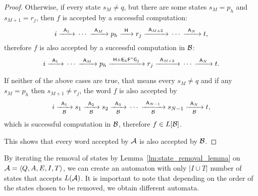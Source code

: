 \begin{proof}
    Otherwise, if every state $s_M \neq q$, but there are some states $s_M = p_h$ and $s_{M+1} = r_j$, then $f$ is accepted by a successful computation:
    \[
        i {\; \xrightarrow[]{\: \; {\mathsf{A}}_1 \: \;} \;} \dotsm {\; \xrightarrow[]{\: \; {\mathsf{A}}_M \: \;} \;} p_h {\; \xrightarrow[]{\: \; {\mathsf{H}} \: \;} \;} r_j {\; \xrightarrow[]{\: \; {\mathsf{A}}_{M+2} \: \;} \;} \dotsm {\; \xrightarrow[]{\: \; {\mathsf{A}}_N \: \;} \;} t,
    \]
    therefore $f$ is also accepted by a successful computation in ${\mathcal{B}}$:
    \[
        i {\; \xrightarrow[]{\: \; {\mathsf{A}}_1 \: \;} \;} \dotsm {\; \xrightarrow[]{\: \; {\mathsf{A}}_M \: \;} \;} p_h {\; \xrightarrow[]{\: \; {\mathsf{H}} + {\mathsf{E}}_h{\mathsf{F}}^*{\mathsf{G}}_j \: \;} \;} r_j {\; \xrightarrow[]{\: \; {\mathsf{A}}_{M+2} \: \;} \;} \dotsm {\; \xrightarrow[]{\: \; {\mathsf{A}}_N \: \;} \;} t.
    \]

    If neither of the above cases are true, that means every $s_M \neq q$ and if any $s_M = p_h$ then $s_{M+1} \neq r_j$, the word $f$ is also accepted by
    \[
        i {\; \xrightarrow[{\mathcal{B}}]{\: \; {\mathsf{A}}_1 \: \;} \;} s_1 {\; \xrightarrow[{\mathcal{B}}]{\: \; {\mathsf{A}}_2 \: \;} \;} s_2 {\; \xrightarrow[{\mathcal{B}}]{\: \; {\mathsf{A}}_3 \: \;} \;} \dotsm {\; \xrightarrow[{\mathcal{B}}]{\: \; {\mathsf{A}}_{N-1} \: \;} \;} s_{N-1} {\; \xrightarrow[{\mathcal{B}}]{\: \; {\mathsf{A}}_N \: \;} \;} t,
    \]
    which is successful computation in ${\mathcal{B}}$, therefore $f \in L[{\mathcal{B}}]$.

    This shows that every word accepted by ${\mathcal{A}}$ is also accepted by ${\mathcal{B}}$.
\end{proof}

By iterating the removal of states by Lemma~\ref*{lm:state_removal_lemma} on ${\mathcal{A}} = \langle Q, A, E, I, T \rangle$, we can create an automaton with only $|I \cup T|$ number of states that accepts $L({\mathcal{A}})$. It is important to note that depending on the order of the states chosen to be removed, we obtain different automata.